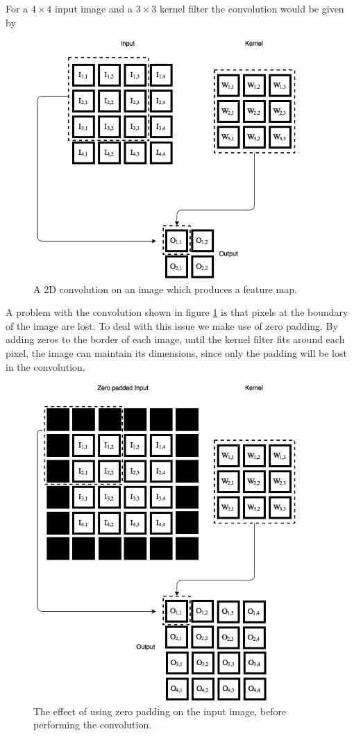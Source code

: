 \documentclass[11pt]{article}
\begin{document}
For a $4 \times 4$ input image and a $3 \times 3$ kernel filter the convolution
would be given by
\begin{figure}[!h]
    \centering
    \includegraphics[width=10cm]{include/conv_2.png}
    \caption{A 2D convolution on an image which produces a feature map.}
    \label{fig:conv}
\end{figure}
\newpage
A problem with the convolution shown in figure \ref{fig:conv} is that
pixels at the boundary of the image are lost.
To deal with this issue we make use of zero padding.
By adding zeros to the border of each image, until the kernel
filter fits around each pixel, the image can maintain its dimensions, since
only the padding will be lost in the convolution.
\begin{figure}[H]
    \centering
    \includegraphics[width=10cm]{include/conv_2_zero_pad.png}
    \caption{The effect of using zero padding on the input image,
             before performing the convolution.}
    \label{fig:conv2}
\end{figure}
\end{document}
